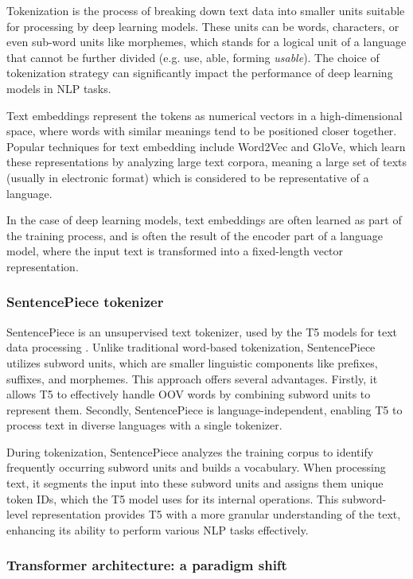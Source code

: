 \documentclass[12.5pt]{article}
\begin{document}
Tokenization is the process of breaking down text data into smaller units suitable for processing by deep learning models. These units can be words, characters, or even sub-word units like morphemes, which stands for a logical unit of a language that cannot be further divided (e.g. use, able, forming \textit{usable}). The choice of tokenization strategy can significantly impact the performance of deep learning models in NLP tasks.

Text embeddings represent the tokens as numerical vectors in a high-dimensional space, where words with similar meanings tend to be positioned closer together. Popular techniques for text embedding include Word2Vec and GloVe, which learn these representations by analyzing large text corpora, meaning a large set of texts (usually in electronic format) which is considered to be representative of a language.

In the case of deep learning models, text embeddings are often learned as part of the training process, and is often the result of the encoder part of a language model, where the input text is transformed into a fixed-length vector representation.

\subsubsection{SentencePiece tokenizer}

SentencePiece is an unsupervised text tokenizer, used by the T5 models for text data processing \cite{Kudo2018}. Unlike traditional word-based tokenization, SentencePiece utilizes subword units, which are smaller linguistic components like prefixes, suffixes, and morphemes. This approach offers several advantages. Firstly, it allows T5 to effectively handle OOV words by combining subword units to represent them. Secondly, SentencePiece is language-independent, enabling T5 to process text in diverse languages with a single tokenizer.

During tokenization, SentencePiece analyzes the training corpus to identify frequently occurring subword units and builds a vocabulary. When processing text, it segments the input into these subword units and assigns them unique token IDs, which the T5 model uses for its internal operations. This subword-level representation provides T5 with a more granular understanding of the text, enhancing its ability to perform various NLP tasks effectively.

\subsubsection{Transformer architecture: a paradigm shift}
\end{document}
